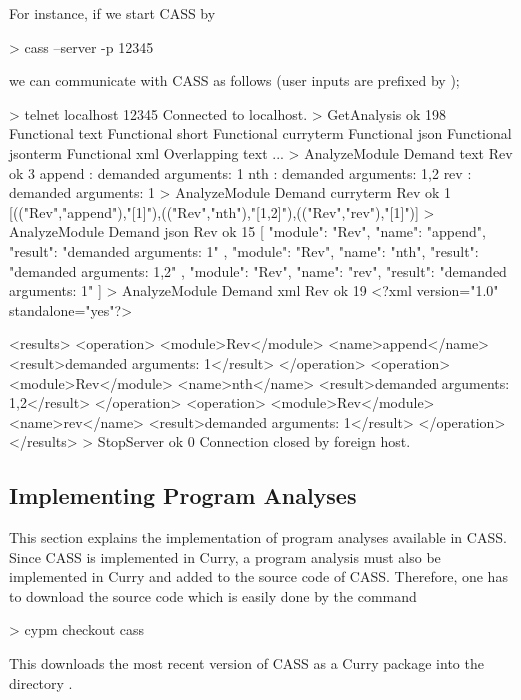 For instance, if we start CASS by
\begin{curry}
> cass --server -p 12345
\end{curry}
we can communicate with CASS as follows (user inputs are prefixed by \ccode{>});
\begin{curry}
> telnet localhost 12345
Connected to localhost.
> GetAnalysis
ok 198
Functional text
Functional short
Functional curryterm
Functional json
Functional jsonterm
Functional xml
Overlapping text
...
> AnalyzeModule Demand text Rev
ok 3
append : demanded arguments: 1
nth : demanded arguments: 1,2
rev : demanded arguments: 1
> AnalyzeModule Demand curryterm Rev
ok 1
[(("Rev","append"),"[1]"),(("Rev","nth"),"[1,2]"),(("Rev","rev"),"[1]")]
> AnalyzeModule Demand json Rev
ok 15
[ {
  "module": "Rev",
  "name": "append",
  "result": "demanded arguments: 1"
}
, {
  "module": "Rev",
  "name": "nth",
  "result": "demanded arguments: 1,2"
}
, {
  "module": "Rev",
  "name": "rev",
  "result": "demanded arguments: 1"
} ]
> AnalyzeModule Demand xml Rev
ok 19
<?xml version="1.0" standalone="yes"?>

<results>
  <operation>
    <module>Rev</module>
    <name>append</name>
    <result>demanded arguments: 1</result>
  </operation>
  <operation>
    <module>Rev</module>
    <name>nth</name>
    <result>demanded arguments: 1,2</result>
  </operation>
  <operation>
    <module>Rev</module>
    <name>rev</name>
    <result>demanded arguments: 1</result>
  </operation>
</results>
> StopServer
ok 0
Connection closed by foreign host.
\end{curry}


\subsection{Implementing Program Analyses}

This section explains the implementation of program analyses
available in CASS.
Since CASS is implemented in Curry, a program analysis
must also be implemented in Curry and added to the source code of CASS.
Therefore, one has to download the source code
which is easily done by the command
\begin{curry}
> cypm checkout cass
\end{curry}
This downloads the most recent version of CASS as a Curry package
into the directory .

